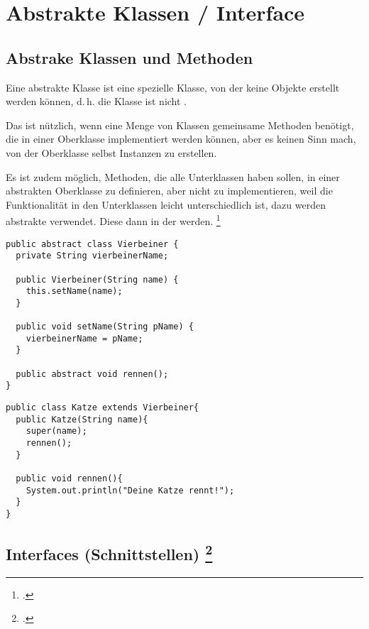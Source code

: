 \documentclass{lehramt-informatik-haupt}
\begin{document}
\chapter{Abstrakte Klassen / Interface}

\cite[Vererbung Seite 28-31 (PDF Seite 156-159)]{brinda}

\section{Abstrake Klassen und Methoden}

Eine abstrakte Klasse ist eine spezielle Klasse, von der keine Objekte
erstellt werden können, d.\,h. die Klasse ist nicht .

Das ist nützlich, wenn eine Menge von Klassen gemeinsame Methoden
benötigt, die in einer Oberklasse implementiert werden können, aber es
keinen Sinn mach, von der Oberklasse selbst Instanzen zu erstellen.

Es ist zudem möglich, Methoden, die alle Unterklassen haben sollen, in
einer abstrakten Oberklasse zu definieren, aber nicht zu implementieren,
weil die Funktionalität in den Unterklassen leicht unterschiedlich ist,
dazu werden abstrakte  verwendet. Diese 
dann in der  werden.
\footcite[Seite 31]{oomup:fs:3}

\begin{verbatim}
public abstract class Vierbeiner {
  private String vierbeinerName;

  public Vierbeiner(String name) {
    this.setName(name);
  }

  public void setName(String pName) {
    vierbeinerName = pName;
  }

  public abstract void rennen();
}
\end{verbatim}

\begin{verbatim}
public class Katze extends Vierbeiner{
  public Katze(String name){
    super(name);
    rennen();
  }

  public void rennen(){
    System.out.println("Deine Katze rennt!");
  }
}
\end{verbatim}

\section{Interfaces (Schnittstellen)
\footcite[Vererbung Seite 32-38 (PDF Seite 160-166)]{brinda}}
\end{document}
